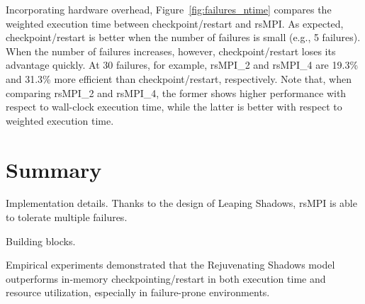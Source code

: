 Incorporating hardware overhead, Figure~\ref{fig:failures_ntime} compares the weighted execution time between checkpoint/restart and rsMPI.  As expected, checkpoint/restart is better when the number of  failures is small (e.g., 5 failures).  When the number of failures increases,  however, checkpoint/restart loses its advantage quickly. At 30 failures, for example, rsMPI\_2 and rsMPI\_4 are 19.3\% and 31.3\% more efficient than checkpoint/restart, respectively.
Note that, when comparing rsMPI\_2 and rsMPI\_4, the former shows higher performance with respect to wall-clock execution time, while the latter is better with respect to weighted execution time. 

\section{Summary}
Implementation details. Thanks to the design of Leaping Shadows, rsMPI is able to tolerate multiple failures.

Building blocks.

Empirical experiments demonstrated that the Rejuvenating Shadows model outperforms in-memory checkpointing/restart in both execution time and resource utilization, especially in failure-prone environments.




